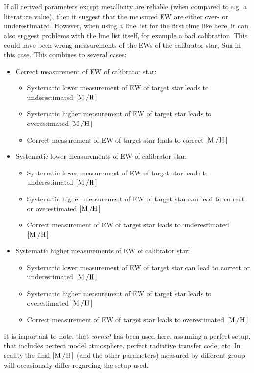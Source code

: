 If all derived parameters except metallicity are reliable (when compared to e.g. a literature
value), then it suggest that the measured EW are either over- or underestimated. However, when using
a line list for the first time like here, it can also suggest problems with the line list itself,
for example a bad calibration. This could have been wrong measurements of the EWs of the calibrator
star, Sun in this case. This combines to several cases:
\begin{itemize}
  \item Correct measurement of EW of calibrator star:
  \begin{itemize}
    \item Systematic lower measurement of EW of target star leads to underestimated $[\ion{M}/\ion{H}]$
    \item Systematic higher measurement of EW of target star leads to overestimated $[\ion{M}/\ion{H}]$
    \item Correct measurement of EW of target star leads to correct $[\ion{M}/\ion{H}]$
  \end{itemize}
  \item Systematic lower measurements of EW of calibrator star:
  \begin{itemize}
    \item Systematic lower measurement of EW of target star leads to underestimated $[\ion{M}/\ion{H}]$
    \item Systematic higher measurement of EW of target star can lead to correct or overestimated $[\ion{M}/\ion{H}]$
    \item Correct measurement of EW of target star leads to underestimated $[\ion{M}/\ion{H}]$
  \end{itemize}
  \item Systematic higher measurements of EW of calibrator star:
  \begin{itemize}
    \item Systematic lower measurement of EW of target star can lead to correct or underestimated $[\ion{M}/\ion{H}]$
    \item Systematic higher measurement of EW of target star leads to overestimated $[\ion{M}/\ion{H}]$
    \item Correct measurement of EW of target star leads to overestimated $[\ion{M}/\ion{H}]$
  \end{itemize}
\end{itemize}
It is important to note, that \emph{correct} has been used here, assuming a perfect setup, that
includes perfect model atmosphere, perfect radiative transfer code, etc. In reality the final
$[\ion{M}/\ion{H}]$ (and the other parameters) measured by different group will occasionally differ
regarding the setup used.

